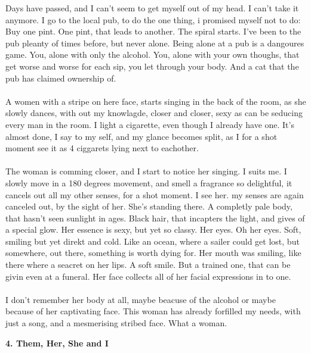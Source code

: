 \documentclass[]{article}
\begin{document}
Days have passed, and I can't seem to get myself out of my head. I can't take it anymore. I go to the local pub, to do the one thing, i promised myself not to do: Buy one pint. One pint, that leads to another. The spiral starts. I've been to the pub pleanty of times before, but never alone. Being alone at a pub is a dangoures game. You, alone with only the alcohol. You, alone with your own thoughs, that get worse and worse for each sip, you let through your body. And a cat that the pub has claimed ownership of. 
\\ \\
A women with a stripe on here face, starts singing in the back of the room, as she slowly dances, with out my knowlagde, closer and closer, sexy as can be seducing every man in the room. I light a cigarette, even though I already have one. It's almost done, I say to my self, and my glance becomes split, as I for a shot moment see it as 4 ciggarets lying next to eachother. 
\\ \\
The woman is comming closer, and I start to notice her singing. I suits me. I slowly move in a 180 degrees movement, and smell a fragrance so delightful, it cancels out all my other senses, for a shot moment. I see her. my senses are again canceled out, by the sight of her. She's standing there. A completly pale body, that hasn't seen sunlight in ages. Black hair, that incapters the light, and gives of a special glow. Her essence is sexy, but yet so classy. Her eyes. Oh her eyes. Soft, smiling but yet direkt and cold. Like an ocean, where a sailer could get lost, but somewhere, out there, something is worth dying for. Her mouth was smiling, like there where a seacret on her lips. A soft smile. But a trained one, that can be givin even at a funeral. Her face collects all of her facial expressions in to one. 
\\ \\
I don't remember her body at all, maybe beacuse of the alcohol or maybe because of her captivating face. This woman has already forfilled my needs, with just a song, and a mesmerising stribed face. What a woman.

\begin{center}
	\large\textbf{4. Them, Her, She and I}
\end{center}
\end{document}
